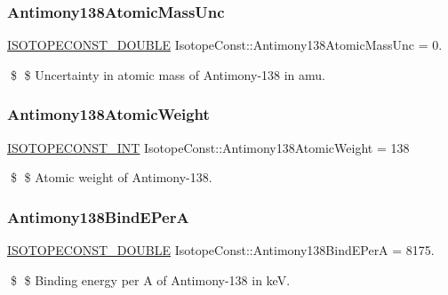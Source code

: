 \subsubsection{\texorpdfstring{Antimony138\+Atomic\+Mass\+Unc}{Antimony138AtomicMassUnc}}
{\footnotesize\ttfamily \mbox{\hyperlink{group___isotope_const-_macros_ga8f45a7272ce02c0b4c65c44636ed719a}{I\+S\+O\+T\+O\+P\+E\+C\+O\+N\+S\+T\+\_\+\+D\+O\+U\+B\+LE}} Isotope\+Const\+::\+Antimony138\+Atomic\+Mass\+Unc = 0.}

\$ \$ Uncertainty in atomic mass of Antimony-\/138 in amu. \mbox{\label{group___isotope_const-_antimony-_sb138_ga00ab574512a624225210aaa8c8b15472}} 
\subsubsection{\texorpdfstring{Antimony138\+Atomic\+Weight}{Antimony138AtomicWeight}}
{\footnotesize\ttfamily \mbox{\hyperlink{group___isotope_const-_macros_ga5f18360b3e99483a35c32d789e62621c}{I\+S\+O\+T\+O\+P\+E\+C\+O\+N\+S\+T\+\_\+\+I\+NT}} Isotope\+Const\+::\+Antimony138\+Atomic\+Weight = 138}

\$ \$ Atomic weight of Antimony-\/138. \mbox{\label{group___isotope_const-_antimony-_sb138_ga55363276eaf35a0e4f71366fcba0f200}} 
\subsubsection{\texorpdfstring{Antimony138\+Bind\+E\+PerA}{Antimony138BindEPerA}}
{\footnotesize\ttfamily \mbox{\hyperlink{group___isotope_const-_macros_ga8f45a7272ce02c0b4c65c44636ed719a}{I\+S\+O\+T\+O\+P\+E\+C\+O\+N\+S\+T\+\_\+\+D\+O\+U\+B\+LE}} Isotope\+Const\+::\+Antimony138\+Bind\+E\+PerA = 8175.}

\$ \$ Binding energy per A of Antimony-\/138 in keV. \mbox{\label{group___isotope_const-_antimony-_sb138_gad6a5d48f94e8178d095982cc7a65f4ba}} 

